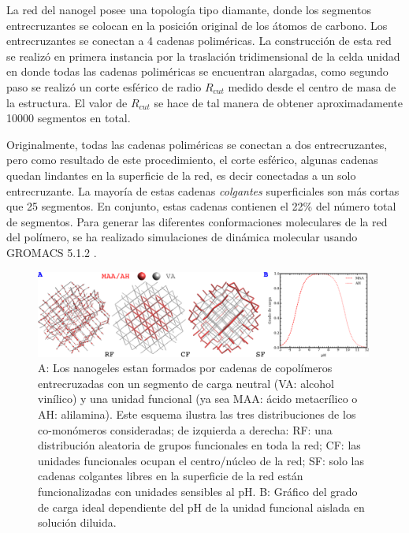 La red del nanogel posee una topolog\'ia tipo diamante, donde los segmentos entrecruzantes se colocan en la posici\'on original de los \'atomos de carbono. Los entrecruzantes se conectan a 4 cadenas polim\'ericas. La construcci\'on de esta red se realiz\'o en primera instancia por la traslaci\'on tridimensional de la celda unidad en donde todas las cadenas polim\'ericas se encuentran alargadas, como segundo paso se realiz\'o un corte esf\'erico de radio $R_{cut}$ medido desde el centro de masa de la estructura. El valor de $R_{cut}$ se hace de tal manera de obtener aproximadamente 10000 segmentos en total. 

Originalmente, todas las cadenas polim\'ericas se  conectan a dos entrecruzantes, pero como resultado de este procedimiento, el corte esf\'erico, algunas cadenas quedan lindantes en la superficie de la red, es decir  conectadas a un solo entrecruzante. La mayor\'ia de estas cadenas \emph{colgantes} superficiales son m\'as cortas que 25 segmentos. En conjunto, estas cadenas contienen el 22\% del n\'umero total de segmentos. Para generar las diferentes conformaciones moleculares de la red del pol\'imero, se ha realizado simulaciones de din\'amica molecular usando GROMACS 5.1.2 \cite{lindahl2001gromacs}.

 \begin{figure}[!htb]
     \centering
     \includegraphics[width=0.99\textwidth]{Figures/graphs-gel2/ideal-charge-model.pdf}
     \caption{A: Los nanogeles estan formados por cadenas de copol\'imeros entrecruzadas con un segmento de carga neutral (VA: alcohol vin\'ilico) y una unidad funcional (ya sea MAA: \'acido metacr\'ilico o AH: alilamina).
     	Este esquema ilustra las tres distribuciones de los co-mon\'omeros consideradas; de izquierda a derecha: RF: una distribuci\'on aleatoria de grupos funcionales en toda la red; CF: las unidades funcionales ocupan el centro/n\'ucleo de la red; SF: solo las cadenas colgantes libres en la superficie de la red est\'an funcionalizadas con unidades sensibles al pH.
     	B: Gr\'afico del grado de carga ideal dependiente del pH de la unidad funcional aislada en soluci\'on diluida.}
     \label{fig:esf:gel-topologies}
 \end{figure}


